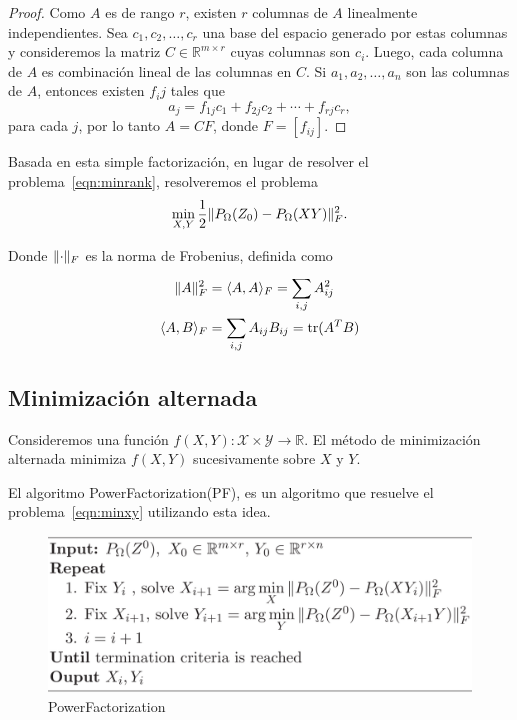 \begin{proof}
    Como $A$ es de rango $r$, existen $r$ columnas de $A$ linealmente independientes. Sea ${c_1, c_2, \ldots, c_r}$ una base del espacio generado por estas columnas y consideremos la matriz $C \in \mathbb{R}^{m \times r}$ cuyas columnas son $c_i$. Luego, cada columna de $A$ es combinación lineal de las columnas en $C$. Si $a_1, a_2, \ldots, a_n$ son las columnas de $A$, entonces existen $f_ij$ tales que
    \begin{equation*}
        a_j = f_{1j}c_1 + f_{2j}c_2 + \cdots + f_{rj}c_r,
    \end{equation*}
    para cada $j$, por lo tanto $A = CF$, donde $F = [f_{ij}]$.
\end{proof}

Basada en esta simple factorización, en lugar de resolver el problema~\eqref{eqn:minrank}, resolveremos el problema 
\begin{equation}
    \min_{X, Y} \frac{1}{2} \lVert P_{\Omega}(Z_0) - P_{\Omega}(XY)\rVert^2_F.
    \label{eqn:minxy}
\end{equation}

Donde $\lVert\cdot\rVert_F$ es la norma de Frobenius, definida como
\begin{align*}
    \lVert A\rVert_F^2 &= \langle A, A\rangle_F = \sum_{i,j}^{} A_{ij}^2 \\
    \langle A, B\rangle_F &= \sum_{i,j} A_{ij}B_{ij} = \operatorname{tr}(A^T B)
\end{align*}

\subsection{Minimización alternada}
Consideremos una función $f(X, Y) \colon \mathcal{X} \times \mathcal{Y} \to \mathbb{R}$. El método de minimización alternada minimiza $f(X, Y)$ sucesivamente sobre $X$ y $Y$.

El algoritmo PowerFactorization(PF), es un algoritmo que resuelve el problema~\eqref{eqn:minxy} utilizando esta idea. 

\begin{figure}[htpb]
    \centering
    \includegraphics[width=0.95\linewidth]{../Results/ASD_Images/PF.PNG}
    \caption{PowerFactorization}\label{fig:PF}
\end{figure}

